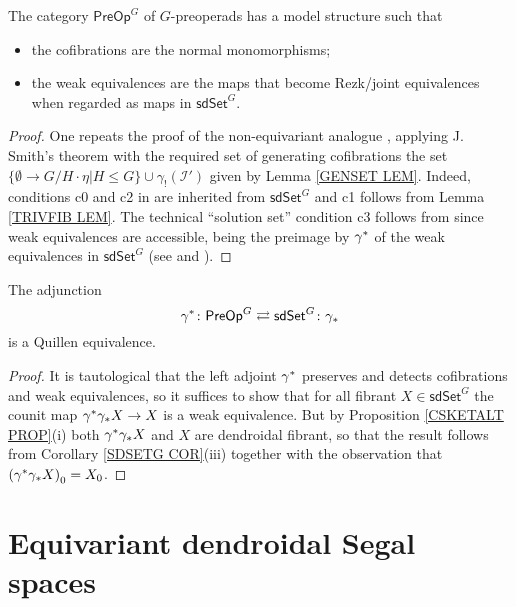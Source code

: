 \documentclass[a4paper,10pt
,draft
]{article}%
\begin{document}
\begin{theorem}\label{PREOPMOD THM}
	The category $\mathsf{PreOp}^G$ of $G$-preoperads has a model structure such that
	\begin{itemize}
		\item the cofibrations are the normal monomorphisms;
		\item the weak equivalences are the maps 
		that become Rezk/joint equivalences when regarded as maps in 
		$\mathsf{sdSet}^G$.
	\end{itemize}
\end{theorem}

\begin{proof}
One repeats the proof of the non-equivariant analogue \cite[Thm. 8.13]{CM13a}, applying J. Smith's theorem \cite[Thm. 1.7]{Bek00} with the required set of generating cofibrations the 
set $\{\emptyset \to G/H\cdot \eta | H \leq G\} \cup \gamma_! (\mathcal{I}')$ given by Lemma \ref{GENSET LEM}.
Indeed, conditions c0 and c2 in \cite{Bek00} are inherited from 
$\mathsf{sdSet}^G$ and c1 follows from Lemma \ref{TRIVFIB LEM}.
The technical ``solution set'' condition c3 follows from 
\cite[Prop. 1.15]{Bek00} since weak equivalences are accessible, being the preimage by $\gamma^{\**}$ of the weak equivalences in 
$\mathsf{sdSet}^G$ 
(see \cite[Cor. A.2.6.5]{Lur09} and \cite[Cor. A.2.6.6]{Lur09}). 
\end{proof}


\begin{theorem}\label{ANOQUEQUIV THM}
The adjunction
\[
	\gamma^{\**} \colon \mathsf{PreOp}^G	
\rightleftarrows
	\mathsf{sdSet}^G \colon \gamma_{\**}
\]
is a Quillen equivalence.
\end{theorem}

\begin{proof}
	It is tautological that the left adjoint $\gamma^{\**}$
	preserves and detects cofibrations and weak equivalences,
	so it suffices to show that for all fibrant
	$X \in \mathsf{sdSet}^G$
	the counit map 
	$\gamma^{\**} \gamma_{\**} X \to X$
	is a weak equivalence. 
	But by
	Proposition \ref{CSKETALT PROP}(i) both
	$\gamma^{\**} \gamma_{\**} X$ and $X$
	are dendroidal fibrant, 
	so that the result follows from 
	Corollary \ref{SDSETG COR}(iii) together with the observation that $\left(\gamma^{\**} \gamma_{\**} X\right)_0 = X_0$.
\end{proof}



\section{Equivariant dendroidal Segal spaces}
\label{EDSS_SEC}
\end{document}
